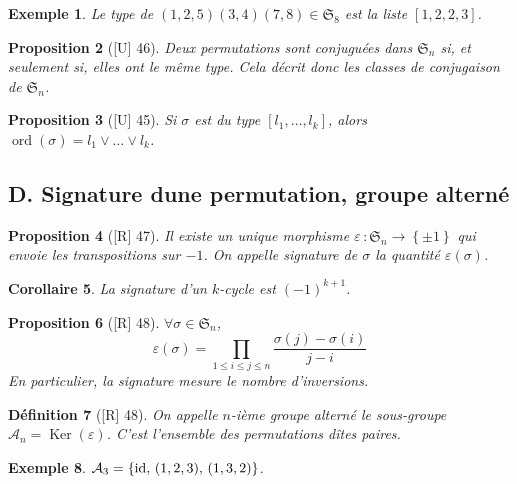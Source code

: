 \documentclass[10pt, a4paper, parskip=full, twoside, twocolumn]{report}
\newtheorem{definition}{Définition}
\newtheorem{proposition}[definition]{Proposition}
\newtheorem{corollary}[definition]{Corollaire}
\newtheorem{example}[definition]{Exemple}
\DeclareMathOperator{\ord}{ord}
\DeclareMathOperator{\Ker}{Ker}
\begin{document}
\begin{example}
	Le type de $(1,2,5)(3,4)(7,8)\in\mathfrak{S}_8$ est la liste $\left[1,2,2,3\right]$.
\end{example}

\begin{proposition}[\textnormal{[U] 46}]
	Deux permutations sont conjuguées dans $\mathfrak{S}_n$ si, et seulement si, elles ont le même type.
	Cela décrit donc les classes de conjugaison de $\mathfrak{S}_n$.
\end{proposition}

\begin{proposition}[\textnormal{[U] 45}]
	Si $\sigma$ est du type $\left[l_1,\dots,l_k\right]$, alors $\ord(\sigma) = l_1 \vee \dots \vee l_k$.
\end{proposition}

\subsection*{D. Signature dune permutation, groupe alterné}

\begin{proposition}[\textnormal{[R] 47}]
	Il existe un unique morphisme $\varepsilon\,\colon \mathfrak{S}_n \to \left\{\pm 1\right\}$ qui envoie
	les transpositions sur $-1$. On appelle \emph{signature} de $\sigma$ la quantité $\varepsilon(\sigma)$.
\end{proposition}

\begin{corollary}
	La signature d'un $k$-cycle est $(-1)^{k+1}$.
\end{corollary}

\begin{proposition}[\textnormal{[R] 48}]
	$\forall\sigma\in\mathfrak{S}_n$, 
	$$\varepsilon(\sigma) = \prod_{1\leq i\leq j\leq n}\frac{\sigma(j) - \sigma(i)}{j-i}$$
	En particulier, la signature mesure le nombre d'inversions.
\end{proposition}

\begin{definition}[\textnormal{[R] 48}]
	On appelle \emph{$n$-ième groupe alterné} le sous-groupe $\mathcal{A}_n = \Ker(\varepsilon)$.
	C'est l'ensemble des permutations dîtes \emph{paires}.
\end{definition}

\begin{example}
	$\mathcal{A}_3 = \left\{\textnormal{id},\, (1,2,3),\, (1,3,2)\right\}$.
\end{example}
\end{document}
